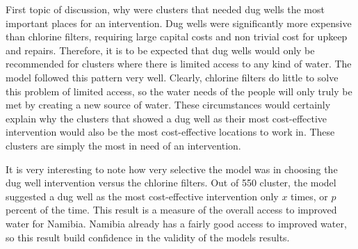 First topic of discussion, why were clusters that needed dug wells the most important places for an intervention. 
Dug wells were significantly more expensive than chlorine filters, requiring large capital costs and non trivial cost for upkeep and repairs. 
Therefore, it is to be expected that dug wells would only be recommended for clusters where there is limited access to any kind of water. 
The model followed this pattern very well.
Clearly, chlorine filters do little to solve this problem of limited access, so the water needs of the people will only truly be met by creating a new source of water. 
These circumstances would certainly explain why the clusters that showed a dug well as their most cost-effective intervention would also be the most cost-effective locations to work in. These clusters are simply the most in need of an intervention.  

It is very interesting to note how very selective the model was in choosing the dug well intervention versus the chlorine filters.
Out of 550 cluster, the model suggested a dug well as the most cost-effective intervention only $x$ times, or $p$ percent of the time.
This result is a measure of the overall access to improved water for Namibia. 
Namibia already has a fairly good access to improved water, so this result build confidence in the validity of the models results.